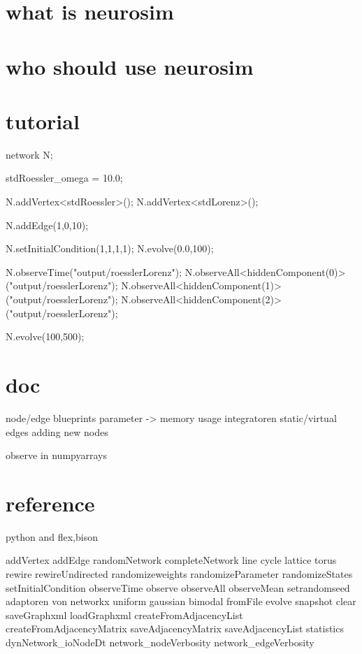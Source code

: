 



\section{what is neurosim}



\section{who should use neurosim}

\section{tutorial}

network N;

stdRoessler_omega = 10.0;

N.addVertex<stdRoessler>();
N.addVertex<stdLorenz>();

N.addEdge(1,0,10);


N.setInitialCondition(1,1,1,1);
N.evolve(0.0,100);

N.observeTime("output/roesslerLorenz");
N.observeAll<hiddenComponent(0)>("output/roesslerLorenz");
N.observeAll<hiddenComponent(1)>("output/roesslerLorenz");
N.observeAll<hiddenComponent(2)>("output/roesslerLorenz");

N.evolve(100,500);


\section{doc}

node/edge blueprints
parameter -> memory usage
integratoren
static/virtual edges
adding new nodes


observe in numpyarrays




\section{reference}


python and flex,bison


addVertex
addEdge
randomNetwork
completeNetwork
line
cycle
lattice
torus
rewire
rewireUndirected
randomizeweights
randomizeParameter
randomizeStates
setInitialCondition
observeTime
observe
observeAll
observeMean
setrandomseed
adaptoren von networkx
uniform
gaussian
bimodal
fromFile
evolve
snapshot
clear
saveGraphxml
loadGraphxml
createFromAdjacencyList
createFromAdjacencyMatrix
saveAdjacencyMatrix
saveAdjacencyList
statistics
dynNetwork_ioNodeDt
network_nodeVerbosity
network_edgeVerbosity






